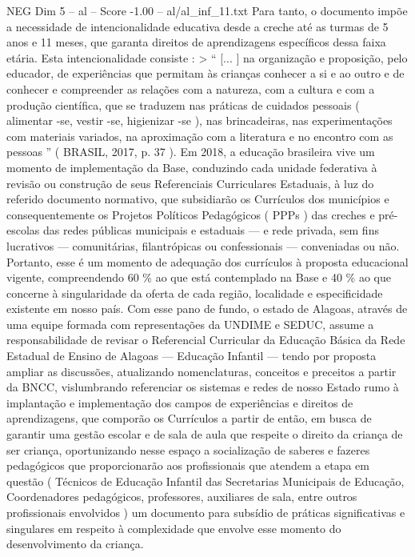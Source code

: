 \begin{textsample}{NEG Dim 5 – al – Score -1.00 – al/al\_inf\_11.txt}
Para tanto, o documento impõe a necessidade de intencionalidade educativa desde a creche até as turmas de 5 anos e 11 meses, que garanta direitos de aprendizagens específicos dessa faixa etária.
Esta intencionalidade consiste : > “ [... ] na organização e proposição, pelo educador, de experiências que permitam às crianças conhecer a si e ao outro e de conhecer e compreender as relações com a natureza, com a cultura e com a produção científica, que se traduzem nas práticas de cuidados pessoais ( alimentar -se, vestir -se, higienizar -se ), nas brincadeiras, nas experimentações com materiais variados, na aproximação com a literatura e no encontro com as pessoas ” ( BRASIL, 2017, p. 37 ).
Em 2018, a educação brasileira vive um momento de implementação da Base, conduzindo cada unidade federativa à revisão ou construção de seus Referenciais Curriculares Estaduais, à luz do referido documento normativo, que subsidiarão os Currículos dos municípios e consequentemente os Projetos Políticos Pedagógicos ( PPPs ) das creches e pré-escolas das redes públicas municipais e estaduais — e rede privada, sem fins lucrativos — comunitárias, filantrópicas ou confessionais — conveniadas ou não.
Portanto, esse é um momento de adequação dos currículos à proposta educacional vigente, compreendendo 60 \% ao que está contemplado na Base e 40 \% ao que concerne à singularidade da oferta de cada região, localidade e especificidade existente em nosso país.
Com esse pano de fundo, o estado de Alagoas, através de uma equipe formada com representações da UNDIME e SEDUC, assume a responsabilidade de revisar o Referencial Curricular da Educação Básica da Rede Estadual de Ensino de Alagoas — Educação Infantil — tendo por proposta ampliar as discussões, atualizando nomenclaturas, conceitos e preceitos a partir da BNCC, vislumbrando referenciar os sistemas e redes de nosso Estado rumo à implantação e implementação dos campos de experiências e direitos de aprendizagens, que comporão os Currículos a partir de então, em busca de garantir uma gestão escolar e de sala de aula que respeite o direito da criança de ser criança, oportunizando nesse espaço a socialização de saberes e fazeres pedagógicos que proporcionarão aos profissionais que atendem a etapa em questão ( Técnicos de Educação Infantil das Secretarias Municipais de Educação, Coordenadores pedagógicos, professores, auxiliares de sala, entre outros profissionais envolvidos ) um documento para subsídio de práticas significativas e singulares em respeito à complexidade que envolve esse momento do desenvolvimento da criança.

\end{textsample}
